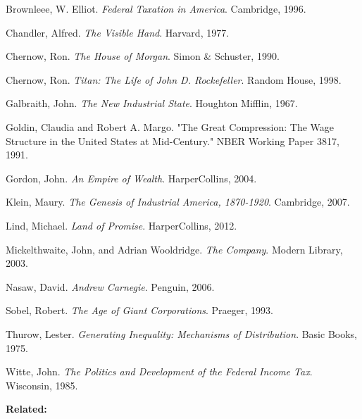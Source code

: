 Brownleee, W. Elliot. \emph{Federal Taxation in America}. Cambridge, 1996.

Chandler, Alfred. \emph{The Visible Hand}. Harvard, 1977.

Chernow, Ron. \emph{The House of Morgan}. Simon \& Schuster, 1990.

Chernow, Ron. \emph{Titan: The Life of John D. Rockefeller}. Random House,
1998.

Galbraith, John. \emph{The New Industrial State}. Houghton Mifflin, 1967.

Goldin, Claudia and Robert A. Margo. "The Great Compression: The
Wage Structure in the United States at Mid-Century." NBER Working
Paper 3817, 1991.

Gordon, John. \emph{An Empire of Wealth}. HarperCollins, 2004.

Klein, Maury. \emph{The Genesis of Industrial America, 1870-1920}. Cambridge,
2007.

Lind, Michael. \emph{Land of Promise}. HarperCollins, 2012.

Mickelthwaite, John, and Adrian Wooldridge. \emph{The Company}. Modern
Library, 2003.

Nasaw, David. \emph{Andrew Carnegie}. Penguin, 2006.

Sobel, Robert. \emph{The Age of Giant Corporations}. Praeger, 1993.

Thurow, Lester. \emph{Generating Inequality: Mechanisms of Distribution}.
Basic Books, 1975.

Witte, John. \emph{The Politics and Development of the Federal Income
Tax}. Wisconsin, 1985.



\textbf{Related:}


